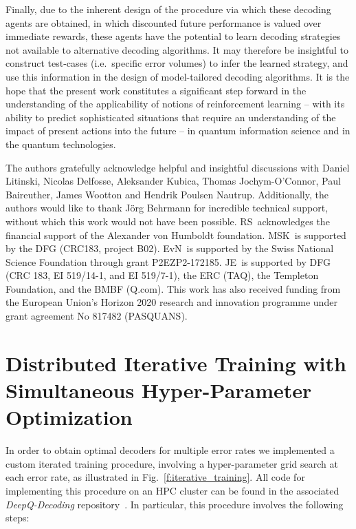 \documentclass[twocolumn,preprintnumbers,amsmath,amssymb,notitlepage,nofootinbib,longbibliography,superscriptaddress,aps,pra,10pt]{revtex4-1}
\begin{document}
	Finally, due to the inherent design of the procedure via which these decoding agents are obtained, in which discounted future performance is valued over immediate rewards, these agents have the potential to learn decoding strategies not available to alternative decoding algorithms.
	It may therefore be insightful to construct test-cases (i.e.\ specific error volumes) to infer the learned strategy, and use this information in the design of model-tailored decoding algorithms. 
	It is the hope that the present work constitutes a significant step forward in the understanding of the applicability of notions of 
	reinforcement learning -- with its ability to predict sophisticated situations that require an understanding of the impact of present actions into the future -- in quantum information science and in the quantum technologies.

	\begin{acknowledgments}
		The authors gratefully acknowledge helpful and insightful discussions with Daniel Litinski, Nicolas Delfosse, Aleksander Kubica, 
		Thomas Jochym-O'Connor, Paul Baireuther, James Wootton and Hendrik Poulsen Nautrup.
		Additionally, the authors would like to thank J\"{o}rg Behrmann for incredible technical support, without which this work would not have been possible.
		RS\ acknowledges the financial support of the Alexander von Humboldt foundation.
		MSK\ is supported by the DFG (CRC183, project B02).
		EvN\ is supported by the Swiss National Science Foundation through grant P2EZP2-172185.
		JE\ is supported by DFG (CRC 183, EI 519/14-1, and EI 519/7-1), the ERC (TAQ), the Templeton Foundation, and the BMBF (Q.com).
		This work has also received funding from the European Union's Horizon 2020 research and innovation programme under grant agreement No 817482 (PASQUANS).
	\end{acknowledgments}

\appendix

\section{Distributed Iterative Training with Simultaneous Hyper-Parameter Optimization}\label{A:training}

	In order to obtain optimal decoders for multiple error rates we implemented a custom iterated training procedure, involving a hyper-parameter grid search at each error rate, as illustrated in Fig.~\ref{f:iterative_training}.
	All code for implementing this procedure on an HPC cluster can be found in the associated \emph{DeepQ-Decoding} repository~\cite{DeepQDecoding}.
	In particular, this procedure involves the following steps:
\end{document}

